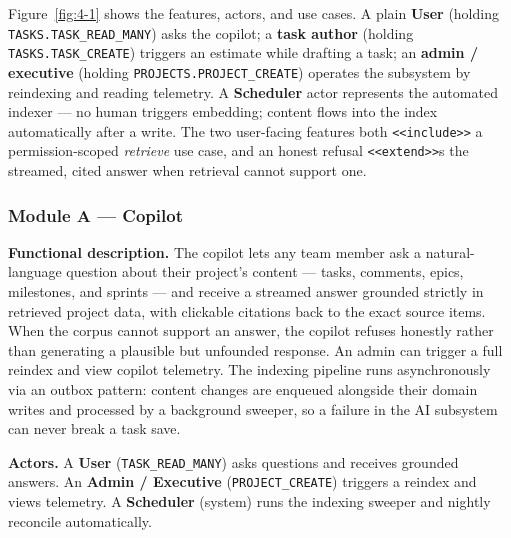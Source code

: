 Figure~\ref{fig:4-1} shows the features, actors, and use cases. A plain \textbf{User} (holding \texttt{TASKS.TASK\_READ\_MANY}) asks the copilot; a \textbf{task
author} (holding \texttt{TASKS.TASK\_CREATE}) triggers an estimate while drafting a task; an \textbf{admin / executive}
(holding \texttt{PROJECTS.PROJECT\_CREATE}) operates the subsystem by reindexing and reading telemetry. A \textbf{Scheduler}
actor represents the automated indexer --- no human triggers embedding; content flows into the index
automatically after a write. The two user-facing features both \texttt{<<include>>} a permission-scoped \emph{retrieve} use case, and
an honest refusal \texttt{<<extend>>}s the streamed, cited answer when retrieval cannot support one.


\subsubsection{Module A --- Copilot}

\textbf{Functional description.} The copilot lets any team member ask a natural-language question
about their project's content --- tasks, comments, epics, milestones, and sprints --- and receive
a streamed answer grounded strictly in retrieved project data, with clickable citations back
to the exact source items. When the corpus cannot support an answer, the copilot refuses
honestly rather than generating a plausible but unfounded response. An admin can trigger a
full reindex and view copilot telemetry. The indexing pipeline runs asynchronously via an
outbox pattern: content changes are enqueued alongside their domain writes and processed by a
background sweeper, so a failure in the AI subsystem can never break a task save.

\textbf{Actors.} A \textbf{User} (\texttt{TASK\_READ\_MANY}) asks questions and receives grounded
answers. An \textbf{Admin / Executive} (\texttt{PROJECT\_CREATE}) triggers a reindex and views
telemetry. A \textbf{Scheduler} (system) runs the indexing sweeper and nightly reconcile
automatically.

